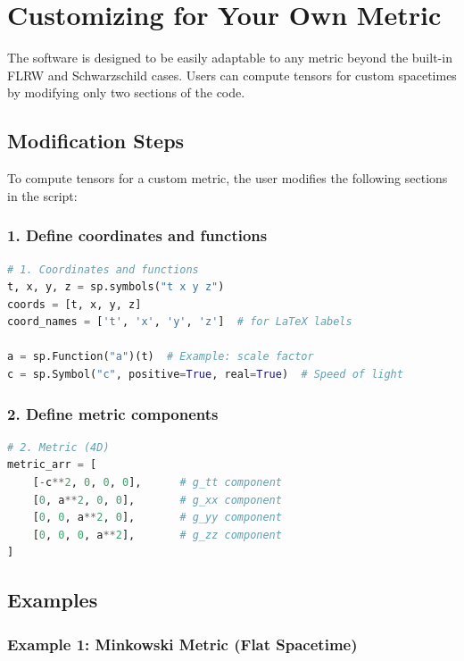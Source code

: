 \documentclass[11pt,a4paper]{article}
\begin{document}
\section{Customizing for Your Own Metric}

The software is designed to be easily adaptable to any metric beyond the built-in FLRW and Schwarzschild cases. Users can compute tensors for custom spacetimes by modifying only two sections of the code.

\subsection{Modification Steps}

To compute tensors for a custom metric, the user modifies the following sections in the script:

\subsubsection*{1. Define coordinates and functions}

\begin{lstlisting}[language=Python]
# 1. Coordinates and functions
t, x, y, z = sp.symbols("t x y z")
coords = [t, x, y, z]
coord_names = ['t', 'x', 'y', 'z']  # for LaTeX labels

a = sp.Function("a")(t)  # Example: scale factor
c = sp.Symbol("c", positive=True, real=True)  # Speed of light
\end{lstlisting}

\subsubsection*{2. Define metric components}

\begin{lstlisting}[language=Python]
# 2. Metric (4D)
metric_arr = [
    [-c**2, 0, 0, 0],      # g_tt component
    [0, a**2, 0, 0],       # g_xx component
    [0, 0, a**2, 0],       # g_yy component
    [0, 0, 0, a**2],       # g_zz component
]
\end{lstlisting}

\subsection{Examples}

\subsubsection*{Example 1: Minkowski Metric (Flat Spacetime)}
\end{document}
